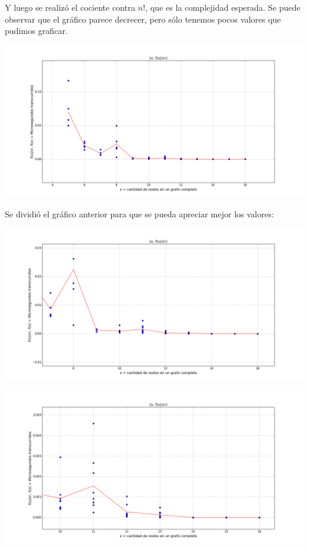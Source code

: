 Y luego se realiz\'o el cociente contra $n!$, que es la complejidad esperada. Se puede observar que el gr\'afico parece decrecer, pero s\'olo tenemos pocos valores que pudimos graficar.
\begin{center}
	\includegraphics[scale=0.41]{img/exacto/fact_n.png}
\end{center}

Se dividi\'o el gr\'afico anterior para que se pueda apreciar mejor los valores:
\begin{center}
	\includegraphics[scale=0.41]{img/exacto/fact_n_8_16.png}
\end{center}

\begin{center}
	\includegraphics[scale=0.41]{img/exacto/fact_n_10_16.png}
\end{center}

